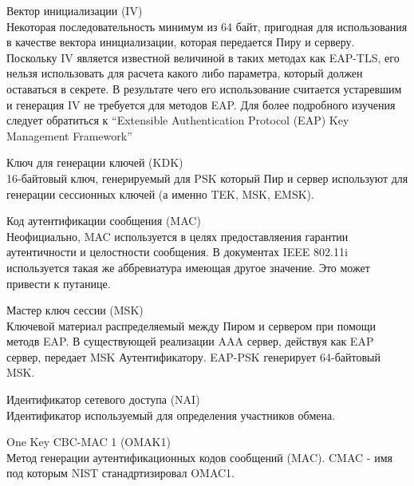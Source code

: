 Вектор инициализации (IV) \\ Некоторая последовательность минимум из 64 байт, пригодная для использования в качестве вектора инициализации, которая передается Пиру и серверу. Поскольку IV является известной величиной в таких методах как EAP-TLS, его нельзя использовать для расчета какого либо параметра, который должен оставаться в секрете. В результате чего его использование считается устаревшим и генерация IV не требуется для методов EAP. Для более подробного изучения следует обратиться к ``Extensible Authentication Protocol (EAP) Key Management Framework''

Ключ для генерации ключей (KDK) \\ 16-байтовый ключ, генерируемый для PSK который Пир и сервер используют для генерации сессионных ключей (а именно TEK, MSK, EMSK).

Код аутентификации сообщения (MAC) \\ Неофициально, MAC используется в целях предоставляения гарантии аутентичности и целостности сообщения. В документах IEEE 802.11i используется такая же аббревиатура имеющая другое значение. Это может привести к путанице.

Мастер ключ сессии (MSK) \\ Ключевой материал распределяемый между Пиром и сервером при помощи методв EAP. В существующей реализации AAA сервер, действуя как EAP сервер, передает MSK Аутентификатору. EAP-PSK генерирует 64-байтовый MSK.

Идентификатор сетевого доступа (NAI) \\ Идентификатор используемый для определения участников обмена.

One Key CBC-MAC 1 (OMAK1) \\ Метод генерации аутентификационных кодов сообщений (MAC). CMAC - имя под которым NIST станадртизировал OMAC1.


